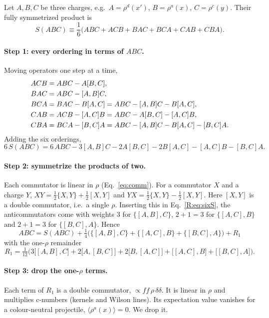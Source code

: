 \documentclass[10pt]{article}
\numberwithin{equation}{section}
\begin{document}
Let $A,B,C$ be three charges, e.g.\ $A=\rho^d(x')$, $B=\rho^a(x)$, $C=\rho^c(y)$. Their fully symmetrized product is
\begin{equation}
S(ABC)\equiv\frac16\big(ABC+ACB+BAC+BCA+CAB+CBA\big).
\end{equation}
\paragraph{Step 1: every ordering in terms of $ABC$.} Moving operators one step at a time,
\begin{align}
ACB&=ABC-A[B,C],\notag\\
BAC&=ABC-[A,B]C,\notag\\
BCA&=BAC-B[A,C]=ABC-[A,B]C-B[A,C],\notag\\
CAB&=ACB-[A,C]B=ABC-A[B,C]-[A,C]B,\notag\\
CBA&=BCA-[B,C]A=ABC-[A,B]C-B[A,C]-[B,C]A.
\end{align}
Adding the six orderings,
\begin{equation}
6\,S(ABC)=6\,ABC-3[A,B]C-2A[B,C]-2B[A,C]-[A,C]B-[B,C]A .
\label{R:eq:sixS}
\end{equation}
\paragraph{Step 2: symmetrize the products of two.} Each commutator is linear in $\rho$ (Eq.~\eqref{eq:comm}). For a commutator $X$ and a charge $Y$, $XY=\frac12\{X,Y\}+\frac12[X,Y]$ and $YX=\frac12\{X,Y\}-\frac12[X,Y]$. Here $[X,Y]$ is a double commutator, i.e.\ a single $\rho$. Inserting this in Eq.~\eqref{R:eq:sixS}, the anticommutators come with weights $3$ for $\{[A,B],C\}$, $2+1=3$ for $\{[A,C],B\}$ and $2+1=3$ for $\{[B,C],A\}$. Hence
\begin{equation}
\boxed{\;ABC=S(ABC)+\tfrac14\Big(\big\{[A,B],C\big\}+\big\{[A,C],B\big\}+\big\{[B,C],A\big\}\Big)+R_1\;}
\label{R:eq:plain}
\end{equation}
with the one-$\rho$ remainder
\begin{equation}
R_1=\tfrac1{12}\Big(3\big[[A,B],C\big]+2\big[A,[B,C]\big]+2\big[B,[A,C]\big]+\big[[A,C],B\big]+\big[[B,C],A\big]\Big).
\end{equation}
\paragraph{Step 3: drop the one-$\rho$ terms.} Each term of $R_1$ is a double commutator, $\propto f f\,\rho\,\delta\delta$. It is linear in $\rho$ and multiplies c-numbers (kernels and Wilson lines). Its expectation value vanishes for a colour-neutral projectile, $\langle\rho^a(x)\rangle=0$. We drop it.
\end{document}
